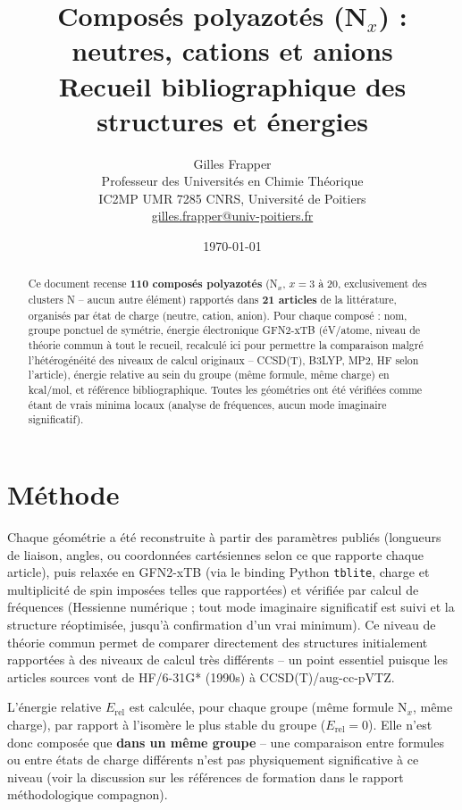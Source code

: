 \documentclass[11pt,a4paper]{article}
\title{\color{accent}\textbf{Compos\'es polyazot\'es (N$_x$) : neutres, cations et anions\\
\large Recueil bibliographique des structures et \'energies}}
\author{Gilles Frapper \\ Professeur des Universit\'es en Chimie Th\'eorique \\ IC2MP UMR 7285 CNRS, Universit\'e de Poitiers \\[2pt] \small \href{mailto:gilles.frapper@univ-poitiers.fr}{gilles.frapper@univ-poitiers.fr}}
\date{\today}
\begin{document}
\maketitle
\thispagestyle{fancy}

\begin{abstract}
\noindent Ce document recense \textbf{110 compos\'es polyazot\'es}
(N$_x$, $x=3$ \`a 20, exclusivement des clusters N -- aucun autre
\'el\'ement) rapport\'es dans \textbf{21 articles} de la litt\'erature,
organis\'es par \'etat de charge (neutre, cation, anion). Pour chaque
compos\'e : nom, groupe ponctuel de sym\'etrie, \'energie \'electronique
GFN2-xTB (\'eV/atome, niveau de th\'eorie commun \`a tout le recueil,
recalcul\'e ici pour permettre la comparaison malgr\'e l'h\'et\'erog\'en\'eit\'e
des niveaux de calcul originaux -- CCSD(T), B3LYP, MP2, HF selon
l'article), \'energie relative au sein du groupe (m\^eme formule, m\^eme
charge) en kcal/mol, et r\'ef\'erence bibliographique. Toutes les
g\'eom\'etries ont \'et\'e v\'erifi\'ees comme \'etant de vrais minima
locaux (analyse de fr\'equences, aucun mode imaginaire significatif).
\end{abstract}

\section{M\'ethode}

Chaque g\'eom\'etrie a \'et\'e reconstruite \`a partir des param\`etres
publi\'es (longueurs de liaison, angles, ou coordonn\'ees cart\'esiennes
selon ce que rapporte chaque article), puis relax\'ee en GFN2-xTB (via le
binding Python \texttt{tblite}, charge et multiplicit\'e de spin impos\'ees
telles que rapport\'ees) et v\'erifi\'ee par calcul de fr\'equences
(Hessienne num\'erique ; tout mode imaginaire significatif est suivi et la
structure r\'eoptimis\'ee, jusqu'\`a confirmation d'un vrai minimum). Ce
niveau de th\'eorie commun permet de comparer directement des structures
initialement rapport\'ees \`a des niveaux de calcul tr\`es diff\'erents --
un point essentiel puisque les articles sources vont de HF/6-31G* (1990s)
\`a CCSD(T)/aug-cc-pVTZ.

L'\'energie relative $E_{\mathrm{rel}}$ est calcul\'ee, pour chaque groupe
(m\^eme formule N$_x$, m\^eme charge), par rapport \`a l'isom\`ere le plus
stable du groupe ($E_{\mathrm{rel}} = 0$). Elle n'est donc compos\'ee que
\textbf{dans un m\^eme groupe} -- une comparaison entre formules ou entre
\'etats de charge diff\'erents n'est pas physiquement significative \`a ce
niveau (voir la discussion sur les r\'ef\'erences de formation dans le
rapport m\'ethodologique compagnon).
\end{document}
